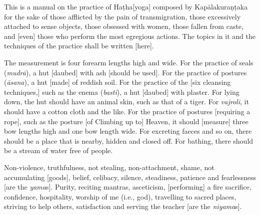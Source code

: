 \begin{eng}
\smallskip


This is a manual on the practice of Haṭha[yoga] composed by Kapālakuraṇṭaka for the sake of those afflicted by the pain of transmigration, those excessively attached to sense objects, those obsessed with women, those fallen from caste, and [even] those who perform the most egregious actions. The topics in it and the techniques of the practice shall be written [here].
\bigskip

%
The measurement is four forearm lengths high and wide. For the practice of seals (\textit{mudrā}), a hut [daubed] with ash [should be used]. For the practice of postures (\textit{āsana}), a hut [made] of reddish soil. For the practice of the [six cleansing techniques,] such as the enema (\textit{basti}), a hut [daubed] with plaster. For lying down, the hut should have an animal skin, such as that of a tiger. For \textit{vajroli}, it should have a cotton cloth and the like. For the practice of postures [requiring a rope], such as the posture [of Climbing up to] Heaven, it should [measure] three bow lengths high and one bow length wide. For excreting faeces and so on, there should be a place that is nearby, hidden and closed off. For bathing, there should be a stream of water free of people.
\bigskip

Non-violence, truthfulness, not stealing, non-attachment, shame, not accumulating [goods], belief, celibacy, silence, steadiness, patience and fearlessness [are the  \textit{yama}s]. Purity, reciting mantras, asceticism, [performing] a fire \mbox{sacrifice,} confidence, hospitality, worship of me (i.e., god), travelling to sacred places, striving to help others, satisfaction and serving the teacher [are the \textit{niyama}s].
\end{eng}

\newpage

